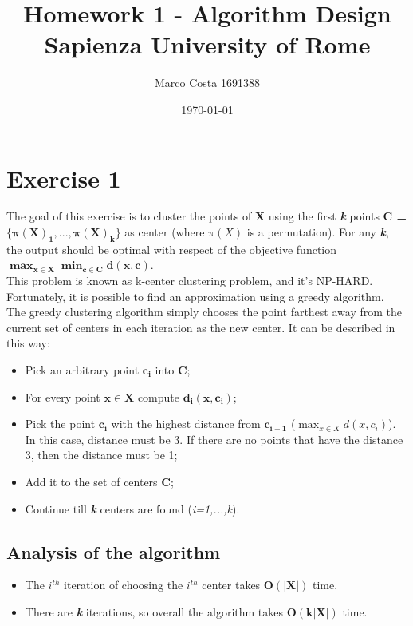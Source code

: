 \documentclass[11pt]{article}
\title{Homework 1 - Algorithm Design \\ \bigskip \large Sapienza University of Rome}
\date{\today}
\author{Marco Costa 1691388}
\begin{document}
\maketitle

\section{Exercise 1}
The goal of this exercise is to cluster the points of \textbf{X} using the first \textit{\textbf{k}} points \textbf{C = $\mathbf{\{ \pi(X)_{1},...,\pi(X)_{k} \}}$} as center (where $\mathit{\pi(X)}$ is a permutation). For any \textit{\textbf{k}}, the output should be optimal with respect of the objective function $\mathbf{\displaystyle\max_{x \in X} \min_{c \in C} d(x,c)}$. \\
This problem is known as k-center clustering problem, and it's NP-HARD. \\
Fortunately, it is possible to find an approximation using a greedy algorithm. \\
The greedy clustering algorithm simply chooses the point farthest away from the current set of centers in each iteration as the new center. It can be described in this way:
\begin{itemize}
	\item Pick an arbitrary point $\mathbf{c_{i}}$ into $\mathbf{C}$;
	\item For every point $\mathbf{x \in X}$ compute $\mathbf{d_{i}(x,c_{i})}$;
	\item Pick the point $\mathbf{c_{i}}$ with the highest distance from $\mathbf{c_{i-1}}$ ($\displaystyle\max_{x \in X} d(x, c_{i})$).
	In this case, distance must be 3. If there are no points that have the distance 3, then the distance must be 1;
	\item Add it to the set of centers $\mathbf{C}$;
	\item Continue till \textit{\textbf{k}} centers are found (\textit{i=1,...,k}).
\end{itemize}

\subsection{Analysis of the algorithm}
\begin{itemize}
	\item The $i^{th}$ iteration of choosing the $i^{th}$ center takes $\mathbf{O(|X|)}$ time.
	\item There are  \textit{\textbf{k }} iterations, so overall the algorithm takes $\mathbf{O(k|X|)}$ time.
\end{itemize}
\end{document}
